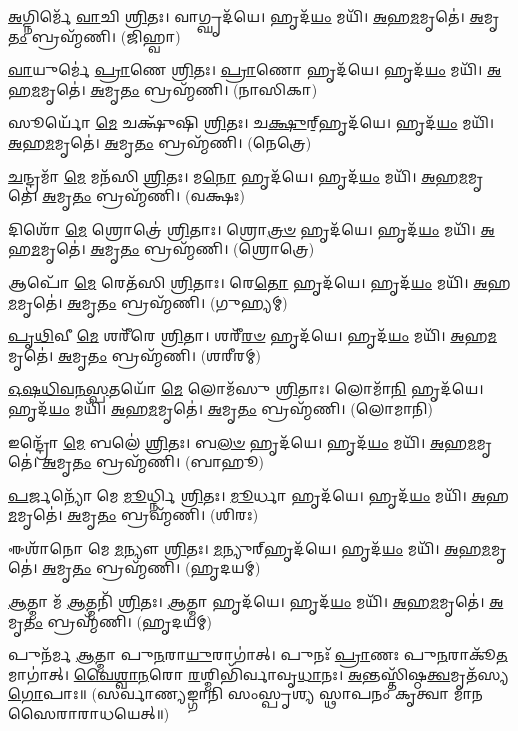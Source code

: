 \-\ul{𑌅}\-𑌗𑍍𑌨𑌿𑌰𑍍𑌮𑍇᳴ \ul{𑌵𑌾}\-𑌚𑌿 \ul{𑌶𑍍𑌰𑌿}\-𑌤𑌃।   𑌵𑌾𑌗𑍍𑌘𑍃𑌦᳴𑌯𑍇।   𑌹𑍃𑌦᳴\-\ul{𑌯𑌂} 𑌮𑌯𑌿᳴।   \ul{𑌅}\-𑌹\-\ul{𑌮}\-𑌮𑍃𑌤𑍇॑।   \ul{𑌅}\-𑌮𑍃\-\ul{𑌤𑌂} 𑌬𑍍𑌰𑌹𑍍𑌮᳴𑌣𑌿। (𑌜𑌿𑌹𑍍𑌵𑌾)

 \ul{𑌵𑌾}\-𑌯𑍁𑌰𑍍𑌮𑍇॑ \ul{𑌪𑍍𑌰𑌾}\-𑌣𑍇 \ul{𑌶𑍍𑌰𑌿}\-𑌤𑌃।   \ul{𑌪𑍍𑌰𑌾}\-𑌣𑍋 𑌹𑍃𑌦᳴𑌯𑍇।   𑌹𑍃𑌦᳴\-\ul{𑌯𑌂} 𑌮𑌯𑌿᳴।   \ul{𑌅}\-𑌹\-\ul{𑌮}\-𑌮𑍃𑌤𑍇॑।   \ul{𑌅}\-𑌮𑍃\-\ul{𑌤𑌂} 𑌬𑍍𑌰𑌹𑍍𑌮᳴𑌣𑌿। (𑌨𑌾𑌸𑌿𑌕𑌾)

   𑌸𑍂𑌰𑍍𑌯𑍋᳴ \ul{𑌮𑍇} 𑌚𑌕𑍍𑌷𑍁᳴𑌷𑌿 \ul{𑌶𑍍𑌰𑌿}\-𑌤𑌃।   𑌚\-\ul{𑌕𑍍𑌷𑍁}\-𑌰𑍍‌॒𑌹𑍃𑌦᳴𑌯𑍇।   𑌹𑍃𑌦᳴\-\ul{𑌯𑌂} 𑌮𑌯𑌿᳴।   \ul{𑌅}\-𑌹\-\ul{𑌮}\-𑌮𑍃𑌤𑍇॑।   \ul{𑌅}\-𑌮𑍃\-\ul{𑌤𑌂} 𑌬𑍍𑌰𑌹𑍍𑌮᳴𑌣𑌿। (𑌨𑍇𑌤𑍍𑌰𑍇)

   \ul{𑌚}\-𑌨𑍍𑌦𑍍𑌰𑌮𑌾᳴ \ul{𑌮𑍇} 𑌮𑌨᳴𑌸𑌿 \ul{𑌶𑍍𑌰𑌿}\-𑌤𑌃।   𑌮\-\ul{𑌨𑍋} 𑌹𑍃𑌦᳴𑌯𑍇।   𑌹𑍃𑌦᳴\-\ul{𑌯𑌂} 𑌮𑌯𑌿᳴।   \ul{𑌅}\-𑌹\-\ul{𑌮}\-𑌮𑍃𑌤𑍇॑।   \ul{𑌅}\-𑌮𑍃\-\ul{𑌤𑌂} 𑌬𑍍𑌰𑌹𑍍𑌮᳴𑌣𑌿। (𑌵𑌕𑍍𑌷𑌃)

   𑌦𑌿𑌶𑍋᳴ \ul{𑌮𑍇} 𑌶𑍍𑌰𑍋𑌤𑍍𑌰𑍇॑ \ul{𑌶𑍍𑌰𑌿}\-𑌤𑌾𑌃।   𑌶𑍍𑌰𑍋\-\ul{𑌤𑍍𑌰}\-\-\ul{𑍞} 𑌹𑍃𑌦᳴𑌯𑍇।   𑌹𑍃𑌦᳴\-\ul{𑌯𑌂} 𑌮𑌯𑌿᳴।   \ul{𑌅}\-𑌹\-\ul{𑌮}\-𑌮𑍃𑌤𑍇॑।   \ul{𑌅}\-𑌮𑍃\-\ul{𑌤𑌂} 𑌬𑍍𑌰𑌹𑍍𑌮᳴𑌣𑌿। (𑌶𑍍𑌰𑍋𑌤𑍍𑌰𑍇)

   𑌆𑌪𑍋᳴ \ul{𑌮𑍇} 𑌰𑍇𑌤᳴𑌸𑌿 \ul{𑌶𑍍𑌰𑌿}\-𑌤𑌾𑌃।   𑌰𑍇\-\ul{𑌤𑍋} 𑌹𑍃𑌦᳴𑌯𑍇।   𑌹𑍃𑌦᳴\-\ul{𑌯𑌂} 𑌮𑌯𑌿᳴।   \ul{𑌅}\-𑌹\-\ul{𑌮}\-𑌮𑍃𑌤𑍇॑।   \ul{𑌅}\-𑌮𑍃\-\ul{𑌤𑌂} 𑌬𑍍𑌰𑌹𑍍𑌮᳴𑌣𑌿। (𑌗𑍁𑌹𑍍𑌯𑌮𑍍)

   \ul{𑌪𑍃}\-\-\ul{𑌥𑌿}\-𑌵𑍀 \ul{𑌮𑍇} 𑌶𑌰𑍀᳴𑌰𑍇 \ul{𑌶𑍍𑌰𑌿}\-𑌤𑌾।   𑌶𑌰𑍀᳴\-\ul{𑌰}\-\-\ul{𑍞} 𑌹𑍃𑌦᳴𑌯𑍇।   𑌹𑍃𑌦᳴\-\ul{𑌯𑌂} 𑌮𑌯𑌿᳴।   \ul{𑌅}\-𑌹\-\ul{𑌮}\-𑌮𑍃𑌤𑍇॑।   \ul{𑌅}\-𑌮𑍃\-\ul{𑌤𑌂} 𑌬𑍍𑌰𑌹𑍍𑌮᳴𑌣𑌿। (𑌶𑌰𑍀𑌰𑌮𑍍)

   \ul{𑌓}\-\-\ul{𑌷}\-\-\ul{𑌧𑌿}\-\-\ul{𑌵}\-\-\ul{𑌨}\-\-\ul{𑌸𑍍𑌪}\-𑌤𑌯𑍋᳴ \ul{𑌮𑍇} 𑌲𑍋𑌮᳴𑌸𑍁 \ul{𑌶𑍍𑌰𑌿}\-𑌤𑌾𑌃।   𑌲𑍋𑌮𑌾᳴\-\ul{𑌨𑌿} 𑌹𑍃𑌦᳴𑌯𑍇।   𑌹𑍃𑌦᳴\-\ul{𑌯𑌂} 𑌮𑌯𑌿᳴।   \ul{𑌅}\-𑌹\-\ul{𑌮}\-𑌮𑍃𑌤𑍇॑।   \ul{𑌅}\-𑌮𑍃\-\ul{𑌤𑌂} 𑌬𑍍𑌰𑌹𑍍𑌮᳴𑌣𑌿। (𑌲𑍋𑌮𑌾𑌨𑌿)

   𑌇𑌨𑍍𑌦𑍍𑌰𑍋᳴ \ul{𑌮𑍇} 𑌬𑌲𑍇॑ \ul{𑌶𑍍𑌰𑌿}\-𑌤𑌃।   𑌬\-\ul{𑌲}\-\-\ul{𑍞} 𑌹𑍃𑌦᳴𑌯𑍇।   𑌹𑍃𑌦᳴\-\ul{𑌯𑌂} 𑌮𑌯𑌿᳴।   \ul{𑌅}\-𑌹\-\ul{𑌮}\-𑌮𑍃𑌤𑍇॑।   \ul{𑌅}\-𑌮𑍃\-\ul{𑌤𑌂} 𑌬𑍍𑌰𑌹𑍍𑌮᳴𑌣𑌿। (𑌬𑌾𑌹𑍂)

   \ul{𑌪}\-𑌰𑍍𑌜𑌨𑍍𑌯𑍋᳴ 𑌮𑍇 \ul{𑌮𑍂}\-𑌰𑍍𑌧𑍍𑌨𑌿 \ul{𑌶𑍍𑌰𑌿}\-𑌤𑌃।   \ul{𑌮𑍂}\-𑌰𑍍𑌧𑌾 𑌹𑍃𑌦᳴𑌯𑍇।   𑌹𑍃𑌦᳴\-\ul{𑌯𑌂} 𑌮𑌯𑌿᳴।   \ul{𑌅}\-𑌹\-\ul{𑌮}\-𑌮𑍃𑌤𑍇॑।   \ul{𑌅}\-𑌮𑍃\-\ul{𑌤𑌂} 𑌬𑍍𑌰𑌹𑍍𑌮᳴𑌣𑌿। (𑌶𑌿𑌰𑌃)

   𑌈𑌶𑌾᳴𑌨𑍋 𑌮𑍇 \ul{𑌮}\-𑌨𑍍𑌯𑍗 \ul{𑌶𑍍𑌰𑌿}\-𑌤𑌃।   \ul{𑌮}\-𑌨𑍍𑌯𑍁𑌰𑍍‌𑌹𑍃𑌦᳴𑌯𑍇।   𑌹𑍃𑌦᳴\-\ul{𑌯𑌂} 𑌮𑌯𑌿᳴।    \ul{𑌅}\-𑌹\-\ul{𑌮}\-𑌮𑍃𑌤𑍇॑।   \ul{𑌅}\-𑌮𑍃\-\ul{𑌤𑌂} 𑌬𑍍𑌰𑌹𑍍𑌮᳴𑌣𑌿। (𑌹𑍃𑌦𑌯𑌮𑍍)

   \ul{𑌆}\-𑌤𑍍𑌮𑌾 𑌮᳴ \ul{𑌆}\-𑌤𑍍𑌮𑌨𑌿᳴ \ul{𑌶𑍍𑌰𑌿}\-𑌤𑌃।   \ul{𑌆}\-𑌤𑍍𑌮𑌾 𑌹𑍃𑌦᳴𑌯𑍇।   𑌹𑍃𑌦᳴\-\ul{𑌯𑌂} 𑌮𑌯𑌿᳴।   \ul{𑌅}\-𑌹\-\ul{𑌮}\-𑌮𑍃𑌤𑍇॑।   \ul{𑌅}\-𑌮𑍃\-\ul{𑌤𑌂} 𑌬𑍍𑌰𑌹𑍍𑌮᳴𑌣𑌿।
(𑌹𑍃𑌦𑌯𑌮𑍍)

   𑌪𑍁𑌨᳴𑌰𑍍𑌮 \ul{𑌆}\-𑌤𑍍𑌮𑌾 𑌪𑍁\-\ul{𑌨}\-𑌰𑌾\-\ul{𑌯𑍁}\-𑌰𑌾𑌗𑌾॑𑌤𑍍।   𑌪𑍁𑌨𑌃᳴ \ul{𑌪𑍍𑌰𑌾}\-𑌣𑌃 𑌪𑍁\-\ul{𑌨}\-𑌰𑌾𑌕𑍂᳴\-\ul{𑌤}\-𑌮𑌾𑌗𑌾॑𑌤𑍍।   \ul{𑌵𑍈}\-\-\ul{𑌶𑍍𑌵𑌾}\-\-\ul{𑌨}\-𑌰𑍋 \ul{𑌰}\-𑌶𑍍𑌮𑌿𑌭𑌿᳴𑌰𑍍𑌵𑌾𑌵𑍃\-\ul{𑌧𑌾}\-𑌨𑌃।   \ul{𑌅}\-𑌨𑍍𑌤𑌸𑍍𑌤𑌿᳴𑌷𑍍𑌠\-\ul{𑌤𑍍𑌵}\-𑌮𑍃𑌤᳴𑌸𑍍𑌯 \ul{𑌗𑍋}\-𑌪𑌾𑌃॥ (𑌸𑌰𑍍𑌵𑌾𑌣𑍍𑌯𑌙𑍍𑌗𑌾𑌨𑌿 𑌸𑌂𑌸𑍍𑌪𑍃𑌶𑍍𑌯 𑌸𑍍𑌥𑌾𑌪𑌨𑌂 𑌕𑍃𑌤𑍍𑌵𑌾 𑌮𑌾𑌨𑌸𑍈𑌰𑌾𑌰𑌾𑌧𑌯𑍇𑌤𑍍॥)
{\small \closesection}

